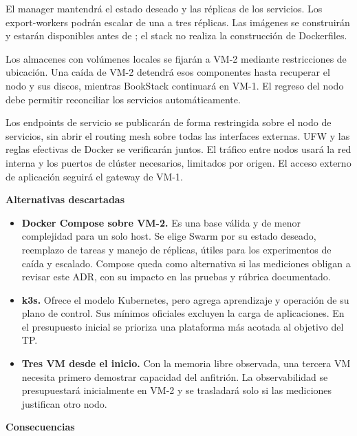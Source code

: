 El manager mantendrá el estado deseado y las réplicas de los servicios. Los export-workers podrán escalar de una a tres réplicas. Las imágenes se construirán y estarán disponibles antes de ; el stack no realiza la construcción de Dockerfiles.

Los almacenes con volúmenes locales se fijarán a VM-2 mediante restricciones de ubicación. Una caída de VM-2 detendrá esos componentes hasta recuperar el nodo y sus discos, mientras BookStack continuará en VM-1. El regreso del nodo debe permitir reconciliar los servicios automáticamente.

Los endpoints de servicio se publicarán de forma restringida sobre el nodo de servicios, sin abrir el routing mesh sobre todas las interfaces externas. UFW y las reglas efectivas de Docker se verificarán juntos. El tráfico entre nodos usará la red interna y los puertos de clúster necesarios, limitados por origen. El acceso externo de aplicación seguirá el gateway de VM-1.

\par\medskip\noindent\textbf{Alternativas descartadas}\par\nobreak\smallskip

\begin{itemize}[leftmargin=1.5em,itemsep=3pt]
\item \textbf{Docker Compose sobre VM-2.} Es una base válida y de menor complejidad para un solo host. Se elige Swarm por su estado deseado, reemplazo de tareas y manejo de réplicas, útiles para los experimentos de caída y escalado. Compose queda como alternativa si las mediciones obligan a revisar este ADR, con su impacto en las pruebas y rúbrica documentado.
\item \textbf{k3s.} Ofrece el modelo Kubernetes, pero agrega aprendizaje y operación de su plano de control. Sus mínimos oficiales excluyen la carga de aplicaciones. En el presupuesto inicial se prioriza una plataforma más acotada al objetivo del TP.
\item \textbf{Tres VM desde el inicio.} Con la memoria libre observada, una tercera VM necesita primero demostrar capacidad del anfitrión. La observabilidad se presupuestará inicialmente en VM-2 y se trasladará solo si las mediciones justifican otro nodo.
\end{itemize}

\par\medskip\noindent\textbf{Consecuencias}\par\nobreak\smallskip

